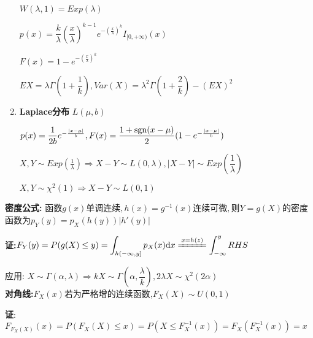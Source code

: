 \begin{enumerate}
$ W(\lambda,1) = Exp(\lambda)$

$ p(x) = \dfrac{k}{\lambda}(\dfrac{x}{\lambda})^{k-1}e^{-(\frac{x}{\lambda})^k}I_{[0,+\infty)}(x)$

$ F(x) = 1-e^{-(\frac{x}{\lambda})^k}$

$ EX = \lambda \Gamma(1+\dfrac{1}{k}), Var(X) = \lambda^2\Gamma(1+\dfrac{2}{k})-(EX)^2$

    \item \textbf{Laplace分布} $ L(\mu,b)$

      $ p(x)=\dfrac{1}{2b}e^{-\frac{|x-\mu|}{b}}, F(x)=\dfrac{1+\operatorname{sgn}(x-\mu)}{2}(1-e^{-\frac{|x-\mu|}{b}})$

      $ X,Y\sim Exp(\frac{1}{\lambda})\Rightarrow X-Y\sim L(0,\lambda), |X-Y|\sim Exp(\dfrac{1}{\lambda})$

    $ X,Y\sim \chi^2(1)\Rightarrow X-Y\sim L(0,1)$

\end{enumerate}

\textbf{密度公式:}
函数$g(x)单调连续,h(x) = g^{-1}(x)连续可微,则Y = g(X)$的密度函数为$ p_Y(y) = p_X(h(y))|h'(y)|$

\textbf{证:}$F_Y(y) = P(g(X)\le y)=\int_{h(-\infty,y]}{p_X(x)\mathrm{d}x}
\xlongequal{x=h(z)}\int_{-\infty}^{y}RHS$

应用: $X\sim \Gamma(\alpha, \lambda) \Rightarrow  kX \sim \Gamma(\alpha, \dfrac{\lambda}{k}), 2\lambda X \sim \chi^2(2\alpha)$
\\

\textbf{对角线:}$ F_X(x)$若为严格增的连续函数,$F_X(X) \sim U(0,1)$

\textbf{证}:$ F_{F_X(X)}(x) = P(F_X(X)\le x) = P(X \le F_X^{-1}(x)) = F_X(F_X^{-1}(x)) =x$
